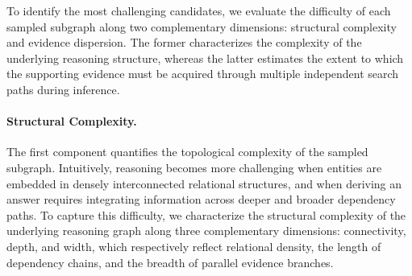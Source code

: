 \documentclass{huawei}
\begin{document}
To identify the most challenging candidates, we evaluate the difficulty of each sampled subgraph along two complementary dimensions: structural complexity and evidence dispersion. The former characterizes the complexity of the underlying reasoning structure, whereas the latter estimates the extent to which the supporting evidence must be acquired through multiple independent search paths during inference.%


\paragraph{Structural Complexity.} 
The first component quantifies the topological complexity of the sampled subgraph. Intuitively, reasoning becomes more challenging when entities are embedded in densely interconnected relational structures, and when deriving an answer requires integrating information across deeper and broader dependency paths. %
To capture this difficulty, we characterize the structural complexity of the underlying reasoning graph along three complementary dimensions: connectivity, depth, and width, which respectively reflect relational density, the length of dependency chains, and the breadth of parallel evidence branches.%
\end{document}
